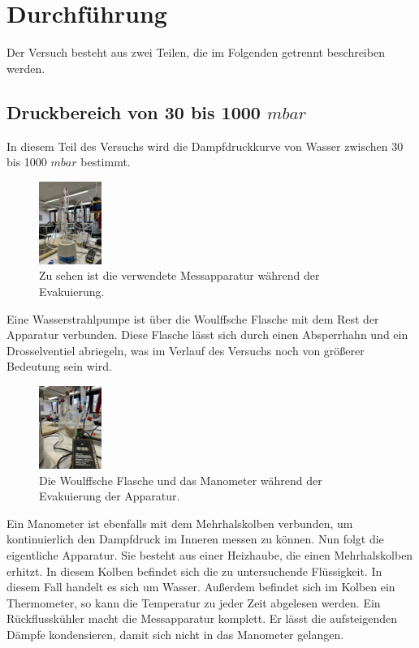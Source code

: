 \section{Durchführung}
\label{sec:Durchführung}

Der Versuch besteht aus zwei Teilen, die im Folgenden getrennt beschreiben werden.
\subsection{Druckbereich von 30 bis 1000 $mbar$}
In diesem Teil des Versuchs wird die Dampfdruckkurve von Wasser zwischen 30 bis 1000 $mbar$ bestimmt.
\begin{figure}
    \centering
    \includegraphics[height=2.7cm, angle=270]{content/Verwendete_Messapparatur.jpeg}
    \caption{Zu sehen ist die verwendete Messapparatur während der Evakuierung.}
    \label{Abb:Messapparatur}
\end{figure}
Eine Wasserstrahlpumpe ist über die Woulffsche Flasche mit dem Rest der Apparatur verbunden.
Diese Flasche lässt sich durch einen Absperrhahn und ein Drosselventiel abriegeln, was im Verlauf des Versuchs noch von größerer Bedeutung sein wird.\\
\begin{figure}[H]
    \centering
    \includegraphics[height=2.7cm, angle=270]{content/Woulffsche_Flasche.jpeg}
    \caption{Die Woulffsche Flasche und das Manometer während der Evakuierung der Apparatur.}
    \label{Abb:Woulffsche_Flasche}
\end{figure}
Ein Manometer ist ebenfalls mit dem Mehrhalskolben verbunden, um kontinuierlich den Dampfdruck im Inneren messen zu können.
Nun folgt die eigentliche Apparatur.
Sie besteht aus einer Heizhaube, die einen Mehrhalskolben erhitzt.
In diesem Kolben befindet sich die zu untersuchende Flüssigkeit.
In diesem Fall handelt es sich um Wasser.
Außerdem befindet sich im Kolben ein Thermometer, so kann die Temperatur zu jeder Zeit abgelesen werden.
Ein Rückflusskühler macht die Messapparatur komplett.
Er lässt die aufsteigenden Dämpfe kondensieren, damit sich nicht in das Manometer gelangen.

